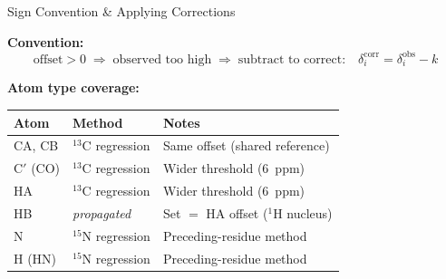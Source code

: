 \documentclass[aspectratio=169,11pt]{beamer}
\begin{document}
\begin{frame}[shrink=8]{Sign Convention \& Applying Corrections}

\textbf{Convention:}
\[
  \text{offset} > 0 \;\Rightarrow\; \text{observed too high} \;\Rightarrow\; \text{subtract to correct:}\quad
  \delta^{\text{corr}}_i = \delta^{\text{obs}}_i - k
\]

\medskip
\textbf{Atom type coverage:}
\begin{center}
\begin{tabular}{lll}
\toprule
\textbf{Atom} & \textbf{Method} & \textbf{Notes} \\
\midrule
CA, CB     & ${}^{13}$C regression & Same offset (shared reference) \\
C$'$ (CO)  & ${}^{13}$C regression & Wider threshold (6~ppm) \\
HA         & ${}^{13}$C regression & Wider threshold (6~ppm) \\
HB         & \textit{propagated}   & Set $=$ HA offset (${}^{1}$H nucleus) \\
N          & ${}^{15}$N regression  & Preceding-residue method \\
H (HN)     & ${}^{15}$N regression  & Preceding-residue method \\
\bottomrule
\end{tabular}
\end{center}
\end{frame}
\end{document}
